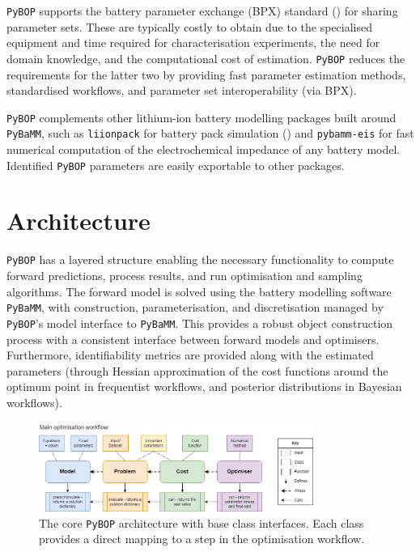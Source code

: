 \documentclass[
]{article}
\begin{document}
\texttt{PyBOP} supports the battery parameter exchange (BPX) standard
() for sharing parameter
sets. These are typically costly to obtain due to the specialised
equipment and time required for characterisation experiments, the need
for domain knowledge, and the computational cost of estimation.
\texttt{PyBOP} reduces the requirements for the latter two by providing
fast parameter estimation methods, standardised workflows, and parameter
set interoperability (via BPX).

\texttt{PyBOP} complements other lithium-ion battery modelling packages
built around \texttt{PyBaMM}, such as \texttt{liionpack} for battery
pack simulation () and
\texttt{pybamm-eis} for fast numerical computation of the
electrochemical impedance of any battery model. Identified
\texttt{PyBOP} parameters are easily exportable to other packages.

\section{Architecture}\label{architecture}

\texttt{PyBOP} has a layered structure enabling the necessary
functionality to compute forward predictions, process results, and run
optimisation and sampling algorithms. The forward model is solved using
the battery modelling software \texttt{PyBaMM}, with construction,
parameterisation, and discretisation managed by \texttt{PyBOP}'s model
interface to \texttt{PyBaMM}. This provides a robust object construction
process with a consistent interface between forward models and
optimisers. Furthermore, identifiability metrics are provided along with
the estimated parameters (through Hessian approximation of the cost
functions around the optimum point in frequentist workflows, and
posterior distributions in Bayesian workflows).

\begin{figure}
\centering
\includegraphics[width=0.8\textwidth,height=\textheight]{figures/PyBOP_components.drawio.png}
\caption{The core \texttt{PyBOP} architecture with base class
interfaces. Each class provides a direct mapping to a step in the
optimisation workflow. \label{fig:classes}}
\end{figure}
\end{document}
